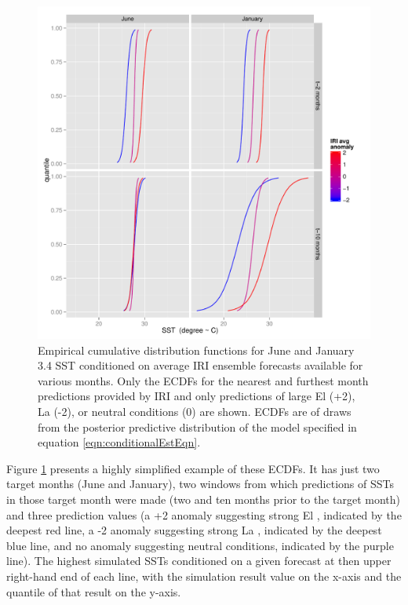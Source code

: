 \documentclass[article]{jss}
\begin{document}
\begin{figure}[!htbp]
  \includegraphics[width=\linewidth]{img/conditionalCDFsIllustrativeExamplesTradConfigSimple.pdf}
  \caption{Empirical cumulative distribution functions for June and January  3.4 SST conditioned on average IRI ensemble forecasts available for various months. Only the ECDFs for the nearest and furthest month predictions provided by IRI and only predictions of large El  (+2), La  (-2), or neutral conditions (0) are shown. ECDFs are of draws from the posterior predictive distribution of the model specified in equation \ref{eqn:conditionalEstEqn}.}
   \label{fig:conditionalCDFsIllustrativeExamplesTradConfigSimple}
\end{figure}

Figure \ref{fig:conditionalCDFsIllustrativeExamplesTradConfigSimple}
presents a highly simplified example of these ECDFs. It has just two
target months (June and January), two windows from which predictions of
SSTs in those target month were made (two and ten months prior to the
target month) and three prediction values (a +2 anomaly suggesting
strong El , indicated by the deepest red line, a -2 anomaly
suggesting strong La , indicated by the deepest blue line,
and no anomaly suggesting neutral conditions, indicated by the purple
line). The highest simulated SSTs conditioned on a given forecast at
then upper right-hand end of each line, with the simulation result value
on the x-axis and the quantile of that result on the y-axis.
\end{document}
